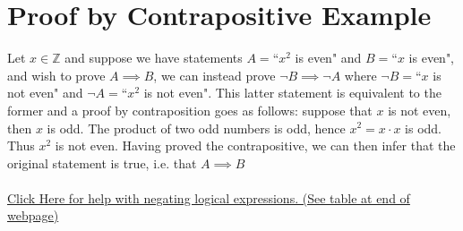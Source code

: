 \section{Proof by Contrapositive Example} Let $x\in \mathbb{Z}$ and suppose we have statements $A=$``$x^2$ is even" and $B=$``$x$ is even", and wish to prove $A\implies B$, we can instead prove $\lnot B \implies \lnot A$ where $\lnot B=$``$x$ is not even" and $\lnot A=$``$x^2$ is not even". This latter statement is equivalent to the former and a proof by contraposition goes as follows: suppose that $x$ is not even, then $x$ is odd. The product of two odd numbers is odd, hence $x^2 = x\cdot x$ is odd. Thus $x^2$ is not even. Having proved the contrapositive, we can then infer that the original statement is true, i.e. that $A \implies B$ \\ \\
\href{https://www.math.toronto.edu/preparing-for-calculus/3_logic/we_3_negation.html}{Click Here for help with negating logical expressions. (See table at end of webpage)}\\

